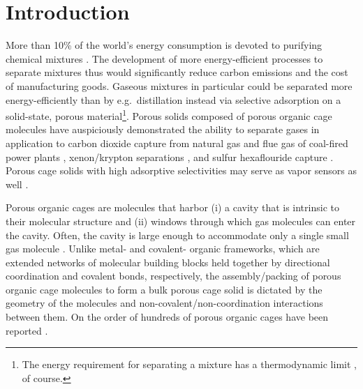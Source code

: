 \documentclass[journal=jacsat,manuscript=article,layout=traditional]{achemso}
\begin{document}
\section{Introduction}
More than 10\% of the world's energy consumption is devoted to purifying chemical mixtures \cite{sholl2016seven}. The development of more energy-efficient processes to separate mixtures thus would significantly reduce carbon emissions and the cost of manufacturing goods. Gaseous mixtures in particular could be separated more energy-efficiently than by e.g.\ distillation \cite{doe_study} instead via selective adsorption on a solid-state, porous material\footnote[2]{The energy requirement for separating a mixture has a thermodynamic limit \cite{bhown2011analysis}, of course.}. Porous solids composed of porous organic cage molecules \cite{tozawa2009porous} have auspiciously demonstrated the ability to separate gases \cite{hasell2016porous} in application to carbon dioxide capture from natural gas \cite{mastalerz2011salicylbisimine} and flue gas of coal-fired power plants \cite{tian2009amorphous,hong2015porphyrin}, xenon/krypton separations \cite{chen2014separation,patil2016noria}, and sulfur hexaflouride capture \cite{sf6seps}. Porous cage solids with high adsorptive selectivities may serve as vapor sensors as well \cite{brutschy2012porous,brutschy2013direct}.

Porous organic cages \cite{hasell2016porous,holst2010porous,cooper2017porousacs} are molecules that harbor (i) a cavity that is intrinsic to their molecular structure and (ii) windows through which gas molecules can enter the cavity. Often, the cavity is large enough to accommodate only a single small gas molecule \cite{miklitz2017computational}. Unlike metal- \cite{furukawa2013chemistry} and covalent- \cite{diercks2017atom} organic frameworks, which are extended networks of molecular building blocks held together by directional coordination and covalent bonds, respectively, the assembly/packing of porous organic cage molecules to form a bulk porous cage solid is dictated by the geometry of the molecules and non-covalent/non-coordination interactions between them\cite{mckeown2010nanoporous}. 
On the order of hundreds of porous organic cages have been reported \cite{evans2016computational}.
\end{document}
